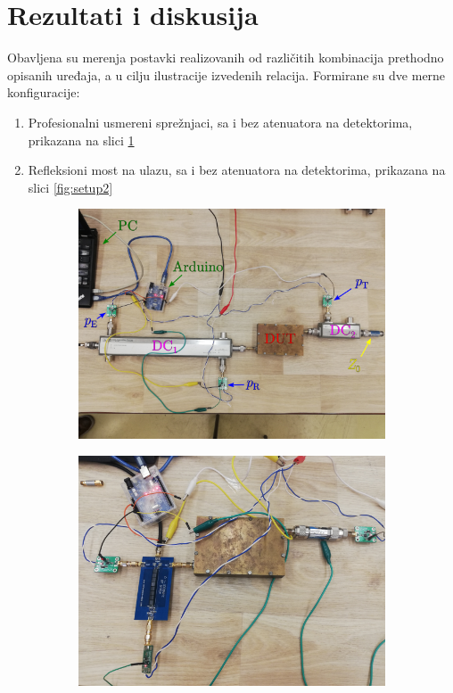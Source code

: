 \documentclass[a4paper, 12pt, diplomski]{etf}
\begin{document}
\section{Rezultati i diskusija}
%
Obavljena su merenja postavki realizovanih
od različitih kombinacija prethodno opisanih 
uređaja, a u cilju ilustracije izvedenih relacija. 
Formirane su dve merne konfiguracije:
\begin{enumerate}[(K1)]
    \item Profesionalni usmereni sprežnjaci, 
    sa i bez atenuatora na 
    detektorima, prikazana na slici 
    \ref{fig:setup1}
    \item Refleksioni most na ulazu, sa i bez atenuatora
    na detektorima, prikazana na slici 
    \ref{fig:setup2}
\end{enumerate}
%
\begin{figure}[ht!]
    \begin{subfigure}[b]{0.49\textwidth}
        \centering
        \includegraphics[width = 1\textwidth]{fig/setup1.png}
        \label{fig:setup1}
    \end{subfigure}
    \hfill
    \begin{subfigure}[b]{0.49\textwidth}
        \centering
        \includegraphics[width = 1\textwidth]{fig/setup2.png}

\end{subfigure}
\end{figure}
\end{document}
